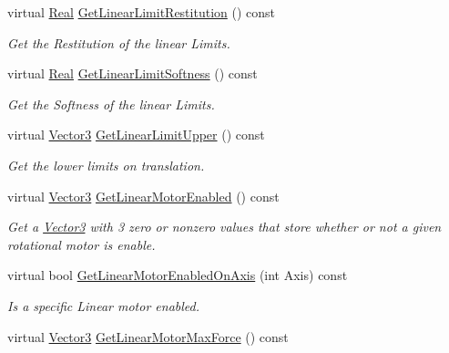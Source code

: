 \begin{DoxyCompactItemize}
virtual \hyperlink{namespaceMezzanine_a726731b1a7df72bf3583e4a97282c6f6}{Real} \hyperlink{classMezzanine_1_1Generic6DofConstraint_ac969ae88077e58e035b7dfb6a44cc3f9}{GetLinearLimitRestitution} () const 
\begin{DoxyCompactList}\small\item\em Get the Restitution of the linear Limits. \item\end{DoxyCompactList}\item 
virtual \hyperlink{namespaceMezzanine_a726731b1a7df72bf3583e4a97282c6f6}{Real} \hyperlink{classMezzanine_1_1Generic6DofConstraint_a26c1a462de1abd0593d50b0da357ed62}{GetLinearLimitSoftness} () const 
\begin{DoxyCompactList}\small\item\em Get the Softness of the linear Limits. \item\end{DoxyCompactList}\item 
virtual \hyperlink{classMezzanine_1_1Vector3}{Vector3} \hyperlink{classMezzanine_1_1Generic6DofConstraint_aff95241b1756b5cc1ffaef4211272e6b}{GetLinearLimitUpper} () const 
\begin{DoxyCompactList}\small\item\em Get the lower limits on translation. \item\end{DoxyCompactList}\item 
virtual \hyperlink{classMezzanine_1_1Vector3}{Vector3} \hyperlink{classMezzanine_1_1Generic6DofConstraint_a89e87415dbe38493f724505cfcecad71}{GetLinearMotorEnabled} () const 
\begin{DoxyCompactList}\small\item\em Get a \hyperlink{classMezzanine_1_1Vector3}{Vector3} with 3 zero or nonzero values that store whether or not a given rotational motor is enable. \item\end{DoxyCompactList}\item 
virtual bool \hyperlink{classMezzanine_1_1Generic6DofConstraint_a7df83de658eec42ff0a35e4470baab82}{GetLinearMotorEnabledOnAxis} (int Axis) const 
\begin{DoxyCompactList}\small\item\em Is a specific Linear motor enabled. \item\end{DoxyCompactList}\item 
virtual \hyperlink{classMezzanine_1_1Vector3}{Vector3} \hyperlink{classMezzanine_1_1Generic6DofConstraint_a954466fb8e3ba12ec702eeab961d75f8}{GetLinearMotorMaxForce} () const 

\end{DoxyCompactItemize}
